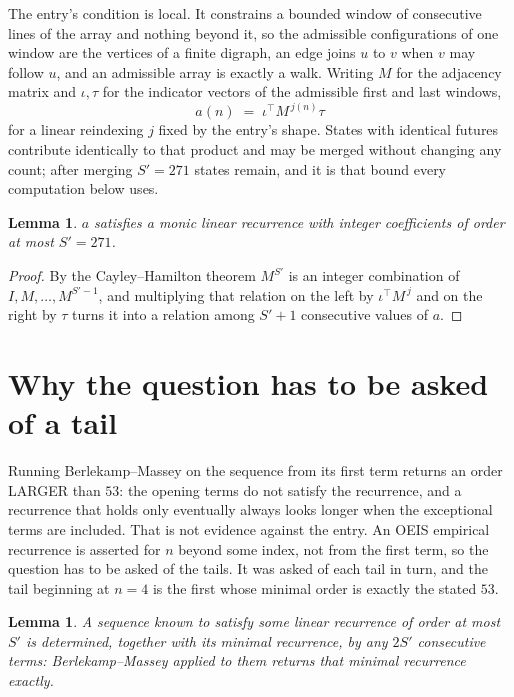 \documentclass[11pt,a4paper]{article}
\theoremstyle{plain}
\newtheorem{lemma}[theorem]{Lemma}
\theoremstyle{definition}
\begin{document}
The entry's condition is local. It constrains a bounded window of consecutive lines of the
array and nothing beyond it, so the admissible configurations of one window are the vertices of
a finite digraph, an edge joins $u$ to $v$ when $v$ may follow $u$, and an admissible array is
exactly a walk. Writing $M$ for the adjacency matrix and $\iota,\tau$ for the indicator vectors
of the admissible first and last windows,
\[
a(n)\;=\;\iota^{\!\top}M^{\,j(n)}\tau
\]
for a linear reindexing $j$ fixed by the entry's shape. States with identical futures
contribute identically to that product and may be merged without changing any count; after
merging $S'=271$ states remain, and it is that bound every computation below uses.

\begin{lemma}\label{lem:cf}
$a$ satisfies a monic linear recurrence with integer coefficients of order at most $S'=271$.
\end{lemma}

\begin{proof}
By the Cayley--Hamilton theorem $M^{S'}$ is an integer combination of $I,M,\dots,M^{S'-1}$,
and multiplying that relation on the left by $\iota^{\!\top}M^{\,j}$ and on the right by
$\tau$ turns it into a relation among $S'+1$ consecutive values of $a$.
\end{proof}

\section{Why the question has to be asked of a tail}

Running Berlekamp--Massey on the sequence from its first term returns an order LARGER than $53$: the opening terms do not satisfy the recurrence, and a recurrence that holds only eventually always looks longer when the exceptional terms are included. That is not evidence against the entry. An OEIS empirical recurrence is asserted for $n$ beyond some index, not from the first term, so the question has to be asked of the tails. It was asked of each tail in turn, and the tail beginning at $n=4$ is the first whose minimal order is exactly the stated $53$.

\begin{lemma}\label{lem:bm}
A sequence known to satisfy some linear recurrence of order at most $S'$ is determined,
together with its minimal recurrence, by any $2S'$ consecutive terms: Berlekamp--Massey applied
to them returns that minimal recurrence exactly.
\end{lemma}
\end{document}
